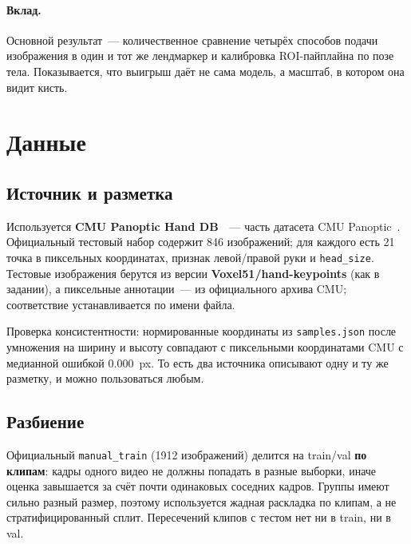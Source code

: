 \documentclass[11pt,a4paper]{article}
\newcommand{\Ntest}{846}
\begin{document}
\paragraph{Вклад.} Основной результат~--- количественное сравнение четырёх
способов подачи изображения в один и тот же лендмаркер и калибровка
ROI-пайплайна по позе тела. Показывается, что выигрыш даёт не сама модель,
а масштаб, в котором она видит кисть.

\section{Данные}

\subsection{Источник и разметка}

Используется \textbf{CMU Panoptic Hand DB}~\cite{simon2017hand}~--- часть
датасета CMU Panoptic~\cite{joo2015panoptic}. Официальный тестовый набор
содержит \Ntest{} изображений; для каждого есть 21 точка в пиксельных
координатах, признак левой/правой руки и \texttt{head\_size}. Тестовые
изображения берутся из версии \textbf{Voxel51/hand-keypoints} (как в задании),
а пиксельные аннотации~--- из официального архива CMU; соответствие
устанавливается по имени файла.

Проверка консистентности: нормированные координаты из \texttt{samples.json}
после умножения на ширину и высоту совпадают с пиксельными координатами CMU
с медианной ошибкой \(0.000\)~px. То есть два источника описывают одну и ту же
разметку, и можно пользоваться любым.

\subsection{Разбиение}

Официальный \texttt{manual\_train} (1912 изображений) делится на train/val
\textbf{по клипам}: кадры одного видео не должны попадать в разные выборки,
иначе оценка завышается за счёт почти одинаковых соседних кадров. Группы имеют
сильно разный размер, поэтому используется жадная раскладка по клипам, а не
стратифицированный сплит. Пересечений клипов с тестом нет ни в train, ни в val.

\begin{table}[h]
  \centering
  \caption{Состав данных. «кисть, \%» --- медианный размер bbox кисти
  относительно большей стороны кадра; \(0.7h\)~--- медианный масштаб для PCK.}
  \label{tab:dataset}
  
\end{table}
\end{document}
